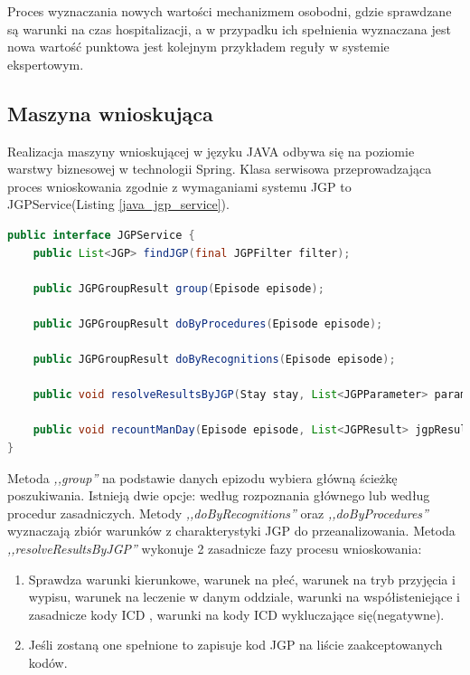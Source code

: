 Proces wyznaczania nowych wartości mechanizmem osobodni, gdzie sprawdzane są warunki na czas hospitalizacji, a w przypadku ich spełnienia wyznaczana jest nowa wartość punktowa jest kolejnym przykładem reguły w systemie ekspertowym.

\subsection{Maszyna wnioskująca}
\label{sec:maszynaWnioskujaca}
Realizacja maszyny wnioskującej w języku JAVA odbywa się na poziomie warstwy biznesowej w technologii Spring. Klasa serwisowa przeprowadzająca proces wnioskowania zgodnie z wymaganiami systemu JGP to JGPService(Listing \ref{java_jgp_service}).

\begin{lstlisting}[language=Java,caption={Serwis JGP - realizacja maszyny wnioskującej. Autor: Mateusz Urbanik},label=java_jgp_service]
public interface JGPService {
    public List<JGP> findJGP(final JGPFilter filter);

    public JGPGroupResult group(Episode episode);

    public JGPGroupResult doByProcedures(Episode episode);

    public JGPGroupResult doByRecognitions(Episode episode);

    public void resolveResultsByJGP(Stay stay, List<JGPParameter> parameters, JGPGroupResult jgpGroupResult);

    public void recountManDay(Episode episode, List<JGPResult> jgpResultList);
}
\end{lstlisting}

Metoda \textit{,,group''} na podstawie danych epizodu wybiera główną ścieżkę poszukiwania. Istnieją dwie opcje: według rozpoznania głównego lub według procedur zasadniczych. Metody \textit{,,doByRecognitions''} oraz \textit{,,doByProcedures''} wyznaczają zbiór warunków z charakterystyki JGP do przeanalizowania. Metoda \textit{,,resolveResultsByJGP''} wykonuje 2 zasadnicze fazy procesu wnioskowania:
\begin{enumerate}\itemsep1pt
 \item Sprawdza warunki kierunkowe, warunek na płeć, warunek na tryb przyjęcia i wypisu, warunek na leczenie w danym oddziale, warunki na współisteniejące i zasadnicze kody ICD , warunki na kody ICD wykluczające się(negatywne).
 \item Jeśli zostaną one spełnione to zapisuje kod JGP na liście zaakceptowanych kodów.
\end{enumerate}

